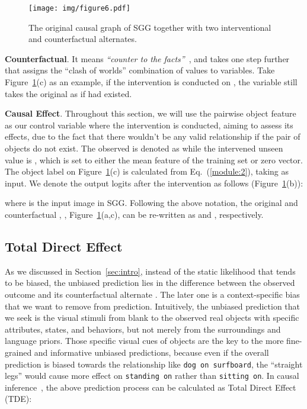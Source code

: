 \documentclass[10pt,twocolumn,letterpaper]{article}
\begin{document}
\begin{figure}[t]
   \begin{minipage}[b]{1.0\linewidth}
   \centerline{\texttt{[image: img/figure6.pdf]}}
   \end{minipage}
   \caption{The original causal graph of SGG together with two interventional and counterfactual alternates.}
   \label{fig:counterfactual} \vspace{-0.2in}
\end{figure}

\noindent\textbf{Counterfactual}. It means \textit{``counter to the facts''}~\cite{roese1997counterfactual}, and takes one step further that assigns the ``clash of worlds'' combination of values to variables. Take Figure~\ref{fig:counterfactual}(c) as an example, if the intervention  is conducted on , the variable  still takes the original  as if  had existed.



\noindent\textbf{Causal Effect}. Throughout this section, we will use the pairwise object feature  as our control variable where the intervention is conducted, aiming to assess its effects, due to the fact that there wouldn't be any valid relationship if the pair of objects do not exist. The observed  is denoted as  while the intervened unseen value is , which is set to either the mean feature of the training set or zero vector. The object label  on Figure~\ref{fig:counterfactual}(c) is calculated from Eq.~(\ref{module:2}), taking  as input. We denote the output logits  after the intervention  as follows (Figure~\ref{fig:counterfactual}(b)):

where  is the input image in SGG. Following the above notation, the original and counterfactual , \ie, Figure~\ref{fig:counterfactual}(a,c), can be  re-written as  and , respectively.

\vspace{-0.05in}
\subsection{Total Direct Effect}
\vspace{-0.05in}
As we discussed in Section~\ref{sec:intro}, instead of the static likelihood that tends to be biased, the unbiased prediction lies in the difference between the observed outcome  and its counterfactual alternate . The later one is a context-specific bias that we want to remove from prediction. Intuitively, the unbiased prediction that we seek is the visual stimuli from blank to the observed real objects with specific attributes, states, and behaviors, but not merely from the surroundings and language priors. Those specific visual cues of objects are the key to the more fine-grained and informative unbiased predictions, because even if the overall prediction is biased towards the relationship like \texttt{dog on surfboard}, the ``straight legs'' would cause more effect on \texttt{standing on} rather than \texttt{sitting on}. In causal inference~\cite{vanderweele2015explanation, vanderweele2013three}, the above prediction process can be calculated as Total Direct Effect (TDE):
\end{document}
